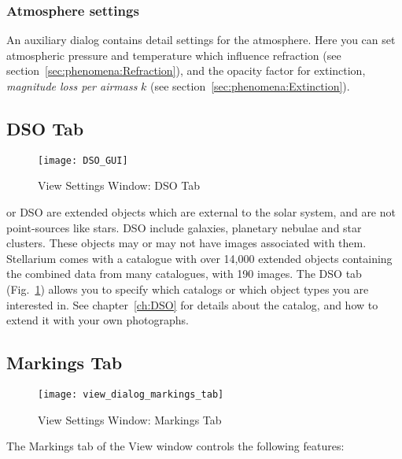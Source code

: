 \subsubsection{Atmosphere settings}
\label{sec:gui:view:sky:atmosphere}

An auxiliary dialog contains detail settings for the atmosphere. Here
you can set atmospheric pressure and temperature which influence
refraction (see section~\ref{sec:phenomena:Refraction}), and the
opacity factor for extinction, \emph{magnitude loss per airmass} $k$
(see section~\ref{sec:phenomena:Extinction}).


\subsection{DSO Tab}
\label{sec:gui:view:dso}

\begin{figure}[t]
\texttt{[image: DSO\_GUI]}
\caption{View Settings Window: DSO Tab}
\label{fig:gui:view:dso}
\end{figure}


 or DSO are extended objects which are
external to the solar system, and are not point-sources like stars.
DSO include galaxies, planetary nebulae and star clusters. These
objects may or may not have images associated with them. Stellarium
comes with a catalogue with over 14,000 extended objects containing
the combined data from many catalogues, with 190 images.  The DSO tab
(Fig.~\ref{fig:gui:view:dso}) allows you to specify which catalogs or
which object types you are interested in. See chapter~\ref{ch:DSO} for
details about the catalog, and how to extend it with your own photographs.





\subsection{Markings Tab}
\label{sec:gui:view:markings}

\begin{figure}[t]
\centering\texttt{[image: view\_dialog\_markings\_tab]}
\caption{View Settings Window: Markings Tab}
\label{fig:gui:view:markings}
\end{figure}

The Markings tab of the View window controls the following features:

